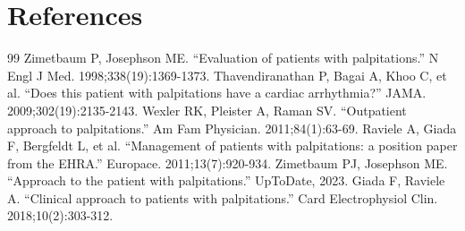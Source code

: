 \section*{References}
\begin{thebibliography}{99}
 Zimetbaum P, Josephson ME. ``Evaluation of patients with palpitations.'' N Engl J Med. 1998;338(19):1369-1373.
 Thavendiranathan P, Bagai A, Khoo C, et al. ``Does this patient with palpitations have a cardiac arrhythmia?'' JAMA. 2009;302(19):2135-2143.
 Wexler RK, Pleister A, Raman SV. ``Outpatient approach to palpitations.'' Am Fam Physician. 2011;84(1):63-69.
 Raviele A, Giada F, Bergfeldt L, et al. ``Management of patients with palpitations: a position paper from the EHRA.'' Europace. 2011;13(7):920-934.
 Zimetbaum PJ, Josephson ME. ``Approach to the patient with palpitations.'' UpToDate, 2023.
 Giada F, Raviele A. ``Clinical approach to patients with palpitations.'' Card Electrophysiol Clin. 2018;10(2):303-312.
\end{thebibliography}
